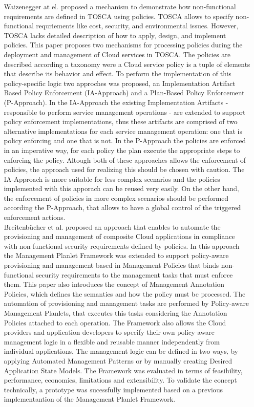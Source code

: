 Waizenegger at el. \cite{waizenegger2013policy4tosca} proposed a mechanism to demonstrate how non-functional requirements are defined in TOSCA using policies. TOSCA allows to specify non-functional
requriements like cost, security, and environmental issues. However, TOSCA lacks detailed description of how to apply, design, and implement policies. This paper proposes two mechanisms for processing
policies during the deployment and management of Cloud services in TOSCA. The policies are described according a taxonomy were a Cloud service policy is a tuple of elements that describe its behavior and effect.
To perform the implementation of this policy-specific logic two approches was proposed, an Implementation Artifact Based Policy Enforcement (IA-Approach) and a Plan-Based Policy Enforcement (P-Approach).
In the IA-Approach the existing Implementation Artifacts - responsible to perform service management operations - are extended to support policy enforcement implementations, thus these artifacts are comprised
of two alternative implementations for each service management operation: one that is policy enforcing and one that is not. In the P-Approach the policies are enforced in an imperative way, for each policy the plan
execute the appropriate steps to enforcing the policy. Altough both of these approaches allows the enforcement of policies, the approach used for realizing this should be chosen with caution. The IA-Approach is
more suitable for less complex scenarios and the policies implemented with this apporach can be reused very easily. On the other hand, the enforcement of policies in more complex scenarios should be performed according
the P-Approach, that allows to have a global control of the triggered enforcement actions.\\

Breitenb\"{u}cher et al. \cite{breitenbucher2014policy} proposed an approach that enables to automate the provisioning and management of composite Cloud applications in compliance with non-functional security requirements
defined by policies. In this approach the Management Planlet Framework \cite{breitenbucher2013policy} was extended to support policy-aware provisioning and management based in Management Policies that binds non-functional
security requirements to the management tasks that must enforce them. This paper also introduces the concept of Management Annotation Policies, which defines the semantics and how the policy must be processed.
The automation of provisioning and management tasks are performed by Policy-aware Management Planlets, that executes this tasks considering the Annotation Policies attached to each operation. The Framework also allows the
Cloud providers and application developers to specify their own policy-aware management logic in a flexible and reusable manner independently from individual applications. The management logic can be defined in two ways,
by applying Automated Management Patterns or by manually creating Desired Application State Models. The Framework was evaluated in terms of feasibility, performance, economics, limitations and extensibility. To validate
the concept technically, a prototype was sucessfully implemented based on a previous implementantion of the Management Planlet Framework.
